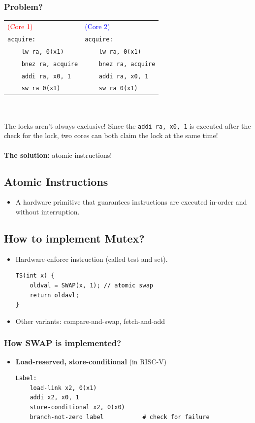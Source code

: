 \documentclass[10pt]{article}
\begin{document}
\subsubsection*{Problem?}
\begin{tabular}{ll}
\textcolor{red}{(Core 1)} & \textcolor{blue}{(Core 2)}\\ 
\texttt{acquire:} & \texttt{acquire:}\\
\texttt{~~~~lw ra, 0(x1)} & \texttt{~~~~lw ra, 0(x1)}\\
\texttt{~~~~bnez ra, acquire} & \texttt{~~~~bnez ra, acquire}\\
\texttt{~~~~addi ra, x0, 1} & \texttt{~~~~addi ra, x0, 1}\\
\texttt{~~~~sw ra 0(x1)} & \texttt{~~~~sw ra 0(x1)}
\end{tabular}\\\\
The locks aren't always exclusive!  Since the \texttt{addi ra, x0, 1} is executed after the check for the lock, two cores can both claim the lock at the same time!\\\\
\textbf{The solution: } atomic instructions!
\subsection*{Atomic Instructions}
\begin{itemize}
    \item A hardware primitive that guarantees instructions are executed in-order and without interruption.
\end{itemize}
\subsection*{How to implement Mutex?}
\begin{itemize}
    \item Hardware-enforce instruction (called test and set).
    \begin{verbatim}
TS(int x) {
    oldval = SWAP(x, 1); // atomic swap
    return oldavl;
}
    \end{verbatim}
    \item Other variants: compare-and-swap, fetch-and-add
\end{itemize}
\subsubsection*{How SWAP is implemented?}
\begin{itemize}
    \item \textbf{Load-reserved, store-conditional} (in RISC-V)
    \begin{verbatim}
Label:
    load-link x2, 0(x1)
    addi x2, x0, 1
    store-conditional x2, 0(x0)
    branch-not-zero label           # check for failure
    \end{verbatim}
\end{itemize}
\end{document}
